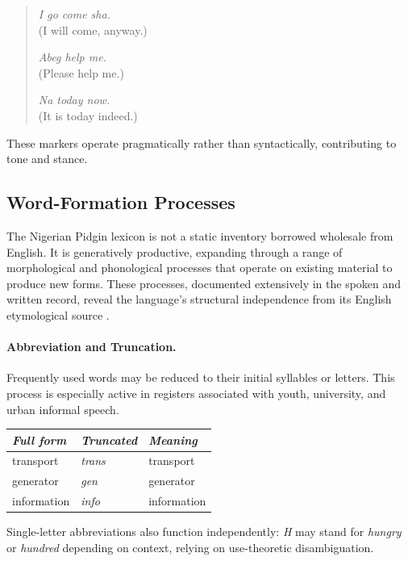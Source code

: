 \documentclass[12pt]{article}
\begin{document}
\begin{quote}
\textit{I go come sha.} \\
(I will come, anyway.)

\textit{Abeg help me.} \\
(Please help me.)

\textit{Na today now.} \\
(It is today indeed.)
\end{quote}

These markers operate pragmatically rather than syntactically, contributing to tone and stance.

\subsection{Word-Formation Processes}

The Nigerian Pidgin lexicon is not a static inventory borrowed wholesale from English. It is generatively productive, expanding through a range of morphological and phonological processes that operate on existing material to produce new forms. These processes, documented extensively in the spoken and written record, reveal the language's structural independence from its English etymological source \cite{AmadiKilani2021}.

\paragraph{Abbreviation and Truncation.}
Frequently used words may be reduced to their initial syllables or letters. This process is especially active in registers associated with youth, university, and urban informal speech.

\begin{center}
\begin{tabular}{lll}
\textit{Full form} & \textit{Truncated} & \textit{Meaning} \\
\hline
transport & \textit{trans} & transport \\
generator & \textit{gen} & generator \\
information & \textit{info} & information \\
\end{tabular}
\end{center}

Single-letter abbreviations also function independently: \textit{H} may stand for \textit{hungry} or \textit{hundred} depending on context, relying on use-theoretic disambiguation.
\end{document}

